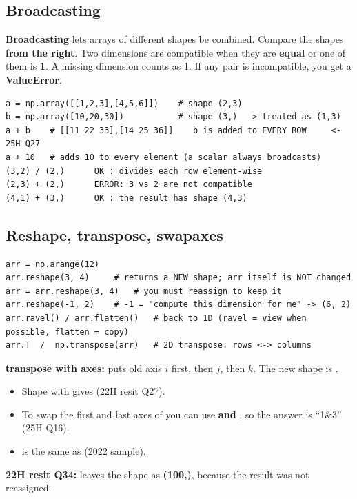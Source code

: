 \subsection{Broadcasting}
\begin{idea}
\textbf{Broadcasting} lets arrays of different shapes be combined. Compare the shapes \textbf{from the right}. Two dimensions are compatible when they are \textbf{equal} or one of them is \textbf{1}. A missing dimension counts as 1. If any pair is incompatible, you get a \textbf{ValueError}.
\end{idea}
\begin{codebox}
\begin{Verbatim}
a = np.array([[1,2,3],[4,5,6]])    # shape (2,3)
b = np.array([10,20,30])           # shape (3,)  -> treated as (1,3)
a + b    # [[11 22 33],[14 25 36]]    b is added to EVERY ROW     <- 25H Q27
a + 10   # adds 10 to every element (a scalar always broadcasts)
(3,2) / (2,)      OK : divides each row element-wise
(2,3) + (2,)      ERROR: 3 vs 2 are not compatible
(4,1) + (3,)      OK : the result has shape (4,3)
\end{Verbatim}
\end{codebox}

\subsection{Reshape, transpose, swapaxes}
\begin{codebox}
\begin{Verbatim}
arr = np.arange(12)
arr.reshape(3, 4)     # returns a NEW shape; arr itself is NOT changed
arr = arr.reshape(3, 4)   # you must reassign to keep it
arr.reshape(-1, 2)    # -1 = "compute this dimension for me" -> (6, 2)
arr.ravel() / arr.flatten()   # back to 1D (ravel = view when possible, flatten = copy)
arr.T  /  np.transpose(arr)   # 2D transpose: rows <-> columns
\end{Verbatim}
\end{codebox}
\textbf{transpose with axes:}  puts old axis $i$ first, then $j$, then $k$. The new shape is .
\begin{itemize}
  \item Shape  with  gives  (22H resit Q27).
  \item To swap the first and last axes of  you can use  \textbf{and} , so the answer is ``1\&3'' (25H Q16).
  \item {} is the same as  (2022 sample).
\end{itemize}
\textbf{22H resit Q34:}  leaves the shape as \textbf{(100,)}, because the result was not reassigned.

